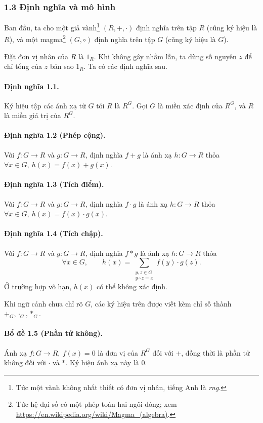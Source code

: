 \documentclass[11pt]{article}
\begin{document}
\subsubsection*{1.3 Định nghĩa và mô hình}

Ban đầu, ta cho một giả vành\footnote{Tức một vành không nhất thiết có đơn vị
nhân, tiếng Anh là \emph{rng}.} \((R,+,\cdot)\) định nghĩa trên tập \(R\) (cũng
ký hiệu là \(R\)), và một magma\footnote{Tức hệ đại số có một phép toán hai
ngôi đóng; xem \url{https://en.wikipedia.org/wiki/Magma_(algebra)}.}
\((G,\circ)\) định nghĩa trên tập \(G\) (cũng ký hiệu là \(G\)).

Đặt đơn vị nhân của \(R\) là \(1_R\). Khi không gây nhầm lẫn, ta dùng số nguyên
\(z\) để chỉ tổng của \(z\) bản sao \(1_R\). Ta có các định nghĩa sau.

\paragraph{Định nghĩa 1.1.}
Ký hiệu tập các ánh xạ từ \(G\) tới \(R\) là \(R^G\). Gọi \(G\) là miền xác
định của \(R^G\), và \(R\) là miền giá trị của \(R^G\).

\paragraph{Định nghĩa 1.2 (Phép cộng).}
Với \(f:G\to R\) và \(g:G\to R\), định nghĩa \(f+g\) là ánh xạ \(h:G\to R\)
thỏa \(\forall x\in G,\ h(x)=f(x)+g(x)\).

\paragraph{Định nghĩa 1.3 (Tích điểm).}
Với \(f:G\to R\) và \(g:G\to R\), định nghĩa \(f\cdot g\) là ánh xạ \(h:G\to R\)
thỏa \(\forall x\in G,\ h(x)=f(x)\cdot g(x)\).

\paragraph{Định nghĩa 1.4 (Tích chập).}
Với \(f:G\to R\) và \(g:G\to R\), định nghĩa \(f*g\) là ánh xạ \(h:G\to R\)
thỏa
\[
  \forall x\in G,\qquad
  h(x)=\sum_{\substack{y,z\in G\\y\circ z=x}} f(y)\cdot g(z).
\]
Ở trường hợp vô hạn, \(h(x)\) có thể không xác định.

Khi ngữ cảnh chưa chỉ rõ \(G\), các ký hiệu trên được viết kèm chỉ số thành
\(+_G,\cdot_G,*_G\).

\paragraph{Bổ đề 1.5 (Phần tử không).}
Ánh xạ \(f:G\to R,\ f(x)=0\) là đơn vị của \(R^G\) đối với \(+\), đồng thời là
phần tử không đối với \(\cdot\) và \(*\). Ký hiệu ánh xạ này là \(0\).
\end{document}
